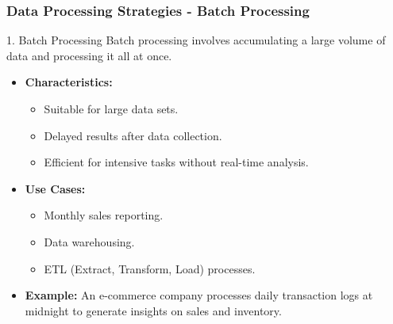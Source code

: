 \documentclass[aspectratio=169]{beamer}
\begin{document}
\begin{frame}[fragile]
  \frametitle{Data Processing Strategies - Batch Processing}
  \begin{block}{1. Batch Processing}
    Batch processing involves accumulating a large volume of data and processing it all at once.
  \end{block}
  \begin{itemize}
    \item \textbf{Characteristics:}
    \begin{itemize}
      \item Suitable for large data sets.
      \item Delayed results after data collection.
      \item Efficient for intensive tasks without real-time analysis.
    \end{itemize}
    
    \item \textbf{Use Cases:}
    \begin{itemize}
      \item Monthly sales reporting.
      \item Data warehousing.
      \item ETL (Extract, Transform, Load) processes.
    \end{itemize}
    
    \item \textbf{Example:} 
    An e-commerce company processes daily transaction logs at midnight to generate insights on sales and inventory.
  \end{itemize}
\end{frame}
\end{document}
